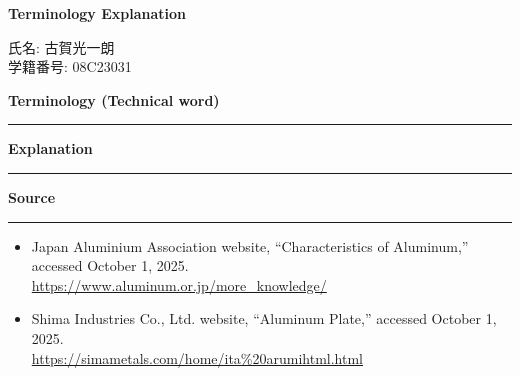 \documentclass[10.5pt, a4paper]{article}
\begin{document}
\begin{center}
    \Large{\textbf{Terminology Explanation}}
\end{center}

\vspace{1cm} %


\noindent 氏名: 古賀光一朗 \\ 
学籍番号: 08C23031 
\vspace{1.5cm} %

\noindent\large{\textbf{Terminology (Technical word)}}
\hrule
\vspace{0.3cm}
\noindent 

\vspace{1cm} %

\noindent\large{\textbf{Explanation}}
\hrule
\vspace{0.3cm}


\vspace{1cm} %

\noindent\large{\textbf{Source}}
\hrule
\vspace{0.3cm}
\begin{itemize}
    \item Japan Aluminium Association website, ``Characteristics of Aluminum,'' accessed October 1, 2025.\\
    \url{https://www.aluminum.or.jp/more_knowledge/}
    \item Shima Industries Co., Ltd. website, ``Aluminum Plate,'' accessed October 1, 2025. \\\url{https://simametals.com/home/ita%20arumihtml.html}
\end{itemize}
\end{document}
